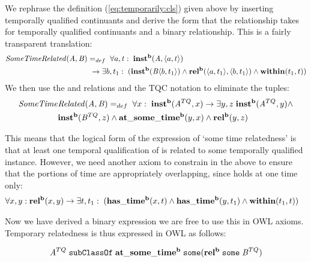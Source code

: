 We rephrase the definition (\ref{eq:temporarily:cls}) given above by inserting
temporally qualified continuants and derive the form that the relationship takes
for temporally qualified continuants and a binary relationship. This is a fairly
transparent translation:
%
\begin{equation}
\begin{split}
\mathit{SomeTimeRelated}(\mathit{A},\mathit{B})& =_{def}\;
\forall a, t:\; \mathrm{\mathbf{inst^b}}(\mathit{A}, \langle a,t\rangle) \\
&\ \rightarrow
\exists b, t_1:\;(\mathrm{\mathbf{inst^b}}(\mathit{B}\langle b,t_1\rangle) \wedge
\mathrm{\mathbf{rel^b}}(\langle a,t_1\rangle,\langle b,t_1\rangle) \wedge \mathrm{\mathbf{within}}(t_1,t))
\end{split}
\end{equation}
%
We then use the  and  relations and the TQC notation to eliminate
the tuples:
\begin{equation}
\begin{split}
\mathit{SomeTime}&\mathit{Related}(\mathit{A},\mathit{B}) =_{def}\;
\forall x:\; \mathrm{\mathbf{inst^b}}(\mathit{A}^{TQ}, x)
 \rightarrow
\exists y,z \; \mathrm{\mathbf{inst^b}}(\mathit{A}^{TQ},y) \wedge \\ & \mathrm{\mathbf{inst^b}}(\mathit{B}^{TQ},z)
 \wedge \mathrm{\mathbf{at\_some\_time^b}}(y,x) \wedge \mathrm{\mathbf{rel^b}}(y,z)
\end{split}
\label{eq:usesSame}
\end{equation}

This means that the logical form of the expression of `some time relatedness' is that
at least one temporal qualification of  is related to some temporally
qualified  instance.
However, we need another axiom to constrain  in the above to ensure that the
portions of time are appropriately overlapping, since  holds at one time
only:
\begin{equation}
\begin{split}
\forall x,y:\;& \mathrm{\mathbf{rel^b}}(x,y) \rightarrow \exists t,t_1:\;
(\mathrm{\mathbf{has\_time^b}}(x, t) \wedge \mathrm{\mathbf{has\_time^b}}(y,t_1) \wedge \mathrm{\mathbf{within}}(t_1,t))
\end{split}
\end{equation}

Now we have derived a binary expression  we are free to use this in OWL
axioms. Temporary relatedness is thus expressed in OWL as follows:

\begin{equation}
\mathit{A}^{TQ}\;\mathtt{subClassOf}\;\mathrm{\mathbf{at\_some\_time^b}}\;\mathtt{some
(}\mathrm{\mathbf{rel^b}}\;\mathtt{some}\;\mathit{B}^{TQ})
\label{eq:tqc:temp}
\end{equation}

